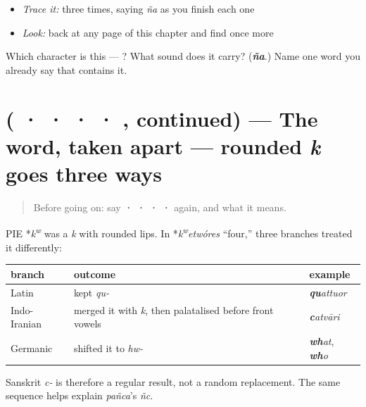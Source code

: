 \begin{quote}
\end{quote}

\begin{itemize}
\raggedright
  \item \emph{Trace it:}  three times, saying \emph{ña} as you finish each one
  \item \emph{Look:} back at any page of this chapter and find  once more
\end{itemize}

\begin{tcolorbox}[breakable,colback=teal!4,colframe=teal!35!black,title={Before you move on}]
Which character is this — ? What sound does it carry? (\emph{\textbf{ña}}.) Name one word you already say that contains it.
\end{tcolorbox}
\section[\texorpdfstring{(\sk{एक} · \sk{द्व} · \sk{त्रि} · \sk{चतुर्} · \sk{पञ्च}, continued)}{(एक · द्व · त्रि · चतुर् · पञ्च, continued)}]{( ·  ·  ·  · , continued) — The word, taken apart — rounded \emph{k} goes three ways}

\label{lesson:SA-C06-number-cognates-more}



\begin{quote}
Before going on: say \textbf{ ·  ·  ·  · } again, and what it means.
\end{quote}

\begin{cousinweb}
PIE *\emph{k\textsuperscript{w}} was a \emph{k} with rounded lips. In *\emph{k\textsuperscript{w}etwóres} “four,” three branches treated it differently:

\noindent
\begin{tabularx}{\linewidth}{@{}>{\raggedright\arraybackslash}X>{\raggedright\arraybackslash}X>{\raggedright\arraybackslash}X@{}}
\toprule
\textbf{branch} & \textbf{outcome} & \textbf{example} \\
\midrule
Latin & kept \emph{qu-} & \emph{\textbf{qu}attuor} \\
Indo-Iranian & merged it with \emph{k}, then palatalised before front vowels & \emph{\textbf{c}atvāri} \\
Germanic & shifted it to \emph{hw-} & \emph{\textbf{wh}at}, \emph{\textbf{wh}o} \\
\bottomrule
\end{tabularx}

Sanskrit \emph{c-} is therefore a regular result, not a random replacement. The same sequence helps explain \emph{pañca}'s \emph{ñc}.
\end{cousinweb}

